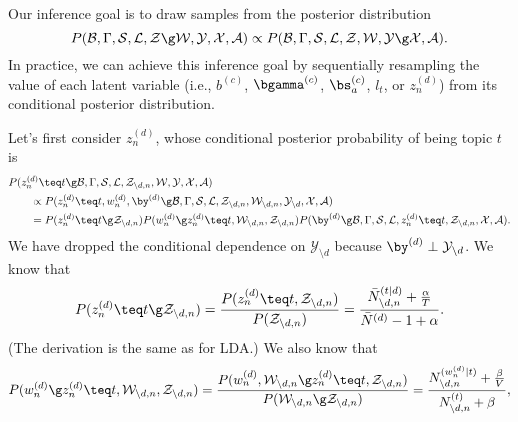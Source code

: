 \documentclass[10pt,english,oneside]{article}
\begin{document}
Our inference goal is to draw samples from the posterior distribution
\begin{equation}
  P(\mathcal{B}, \Gamma, \mathcal{S}, \mathcal{L},
  \mathcal{Z} \g \mathcal{W}, \mathcal{Y}, \mathcal{X}, \mathcal{A})
  \propto P(\mathcal{B}, \Gamma, \mathcal{S}, \mathcal{L},
    \mathcal{Z}, \mathcal{W}, \mathcal{Y} \g \mathcal{X}, \mathcal{A}).
  \end{equation}
In practice, we can achieve this inference goal by sequentially
resampling the value of each latent variable (i.e., $b^{(c)}$,
$\bgamma^{(c)}$, $\bs^{(c)}_a$, $l_t$, or $z^{(d)}_n$) from its
conditional posterior distribution.

Let's first consider $z_n^{(d)}$, whose conditional posterior probability of being
topic $t$ is
\begin{align}
  &P(z_n^{(d)} \teq t \g \mathcal{B}, \Gamma, \mathcal{S}, \mathcal{L},
    \mathcal{Z}_{\setminus d, n}, \mathcal{W}, \mathcal{Y},
    \mathcal{X}, \mathcal{A}) \notag \\
    &\qquad \propto P(z_n^{(d)} \teq t, w_n^{(d)}, \by^{(d)} \g
    \mathcal{B}, \Gamma, \mathcal{S},
    \mathcal{L},\mathcal{Z}_{\setminus d, n}, \mathcal{W}_{\setminus
      d, n},
    \mathcal{Y}_{\setminus d},
        \mathcal{X}, \mathcal{A}) \\
        &\qquad = P(z_n^{(d)} \teq t \g \mathcal{Z}_{\setminus d, n})
        P(w_n^{(d)} \g z_n^{(d)} \teq t, \mathcal{W}_{\setminus d, n},
        \mathcal{Z}_{\setminus d, n})
        P(\by^{(d)} \g \mathcal{B},
        \Gamma, \mathcal{S}, \mathcal{L}, z_n^{(d)} \teq t,
        \mathcal{Z}_{\setminus d, n}, \mathcal{X}, \mathcal{A}).
\end{align}
We have dropped the conditional dependence on
$\mathcal{Y}_{\setminus d}$ because $\by^{(d)} \perp
\mathcal{Y}_{\setminus d}$. We know that
\begin{equation}
  P(z_n^{(d)} \teq t \g \mathcal{Z}_{\setminus d, n}) = \frac{P(z_n^{(d)} \teq t, \mathcal{Z}_{\setminus d,
      n})}{P(\mathcal{Z}_{\setminus d, n})} = \frac{\bar{N}^{(t|d)}_{\setminus d, n} +
    \frac{\alpha}{T}}{\bar{N}^{(d)} - 1 + \alpha}.
\end{equation}
(The
derivation is the same as for LDA.) We
also know that 
\begin{equation}
  P(w_n^{(d)} \g z_n^{(d)} \teq t, \mathcal{W}_{\setminus d, n},
  \mathcal{Z}_{\setminus d, n}) = \frac{P(w^{(d)}_n,
    \mathcal{W}_{\setminus d, n} \g z_n^{(d)} \teq t,
    \mathcal{Z}_{\setminus d, n})}{P(\mathcal{W}_{\setminus d, n} \g
    \mathcal{Z}_{\setminus d, n})} =
  \frac{N^{(w_n^{(d)}|t)}_{\setminus d, n} +
    \frac{\beta}{V}}{N^{(t)}_{\setminus d, n} + \beta},
\end{equation}
\end{document}
